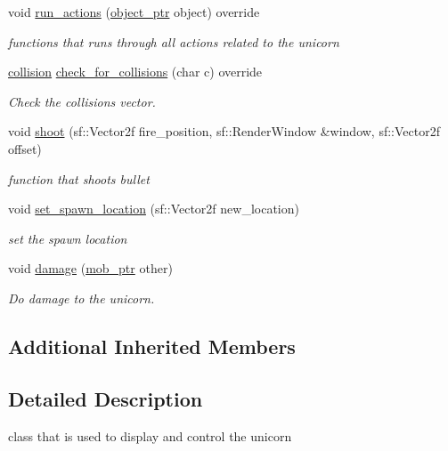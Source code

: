 \begin{DoxyCompactItemize}
void \hyperlink{classunicorn_aadb47a9981c46d6add8704074df117df}{run\+\_\+actions} (\hyperlink{typedefs_8hpp_aab5add95f06d2ba25dbfed8eb07274fa}{object\+\_\+ptr} object) override
\begin{DoxyCompactList}\small\item\em functions that runs through all actions related to the unicorn \end{DoxyCompactList}\item 
\hyperlink{structcollision}{collision} \hyperlink{classunicorn_a40fe782f273abf46f6121db9aa4bf77a}{check\+\_\+for\+\_\+collisions} (char c) override
\begin{DoxyCompactList}\small\item\em Check the collisions vector. \end{DoxyCompactList}\item 
void \hyperlink{classunicorn_af448a3fa5fc5f09254b50afa151ce42b}{shoot} (sf\+::\+Vector2f fire\+\_\+position, sf\+::\+Render\+Window \&window, sf\+::\+Vector2f offset)
\begin{DoxyCompactList}\small\item\em function that shoots bullet \end{DoxyCompactList}\item 
void \hyperlink{classunicorn_af0e2581c426b4b1e32f8a7b484b4e242}{set\+\_\+spawn\+\_\+location} (sf\+::\+Vector2f new\+\_\+location)
\begin{DoxyCompactList}\small\item\em set the spawn location \end{DoxyCompactList}\item 
void \hyperlink{classunicorn_a8b5a22ab1b26daa540ceb09b5b5747d8}{damage} (\hyperlink{typedefs_8hpp_a09ee7f853fc9bc830a9445a06fd53d4b}{mob\+\_\+ptr} other)
\begin{DoxyCompactList}\small\item\em Do damage to the unicorn. \end{DoxyCompactList}\end{DoxyCompactItemize}
\subsection*{Additional Inherited Members}


\subsection{Detailed Description}
class that is used to display and control the unicorn 

